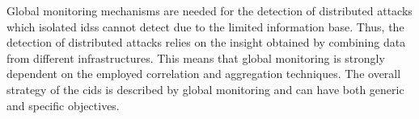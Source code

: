 Global monitoring mechanisms are needed for the detection of distributed attacks which isolated \gls{ids}s cannot detect due to the limited information base. Thus, the detection of distributed attacks relies on the insight obtained by combining data from different infrastructures. This means that global monitoring is strongly dependent on the employed correlation and aggregation techniques. The overall strategy of the \gls{cids} is described by global monitoring and can have both generic and specific objectives. 